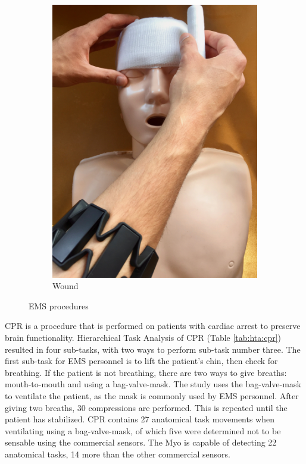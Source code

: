 \begin{figure}
\begin{subfigure}[b]{0.18\textwidth}
		\includegraphics[width=\textwidth]{pictures/wound}
		\caption{Wound}
		\label{fig:wound}
	\end{subfigure}
 	\caption{EMS procedures}
 	\label{fig:EMS-procedures}
\end{figure}
\par CPR is a procedure that is performed on patients with cardiac arrest to preserve brain functionality. Hierarchical Task Analysis of CPR (Table \ref{tab:hta:cpr}) resulted in four sub-tasks, with two ways to perform sub-task number three. The first sub-task for EMS personnel is to lift the patient's chin, then check for breathing. If the patient is not breathing, there are two ways to give breaths: mouth-to-mouth and using a bag-valve-mask. The study uses the bag-valve-mask to ventilate the patient, as the mask is commonly used by EMS personnel. After giving two breaths, 30 compressions are performed. This is repeated until the patient has stabilized. CPR contains 27 anatomical task movements when ventilating using a bag-valve-mask, of which five were determined not to be sensable using the commercial sensors. The Myo is capable of detecting 22 anatomical tasks, 14 more than the other commercial sensors.
